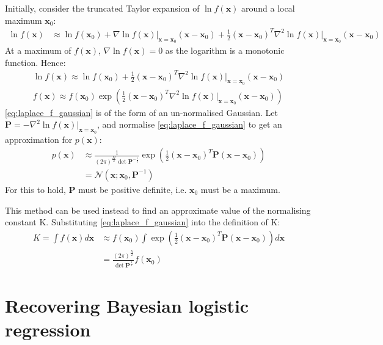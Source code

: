 \documentclass[a4paper]{article}
\begin{document}
    Initially, consider the truncated Taylor expansion of $\ln f(\bm{x})$ around a local maximum $\bm{x}_0$:
    \begin{align}
        \ln f(\bm{x}) &\approx \ln f(\bm{x}_0) + \nabla \ln f(\bm{x}) \big|_{\bm{x} = \bm{x}_0} (\bm{x} - \bm{x}_0)
        + \frac{1}{2} (\bm{x} - \bm{x}_0)^T \nabla^2 \ln f(\bm{x}) \big|_{\bm{x} = \bm{x}_0} (\bm{x} - \bm{x}_0)
    \end{align}
    At a maximum of $f(\bm{x})$, $\nabla \ln f(\bm{x}) = 0$ as the logarithm is a monotonic function. Hence:
    \begin{align}
        \ln f(\bm{x}) \approx \ln f(\bm{x}_0) + \frac{1}{2} (\bm{x} - \bm{x}_0)^T \nabla^2 \ln f(\bm{x}) \big|_{\bm{x} = \bm{x}_0} (\bm{x} - \bm{x}_0) \nonumber \\
        f(\bm{x}) \approx f(\bm{x}_0) \exp \left(\frac{1}{2} (\bm{x} - \bm{x}_0)^T \nabla^2 \ln f(\bm{x}) \big|_{\bm{x} = \bm{x}_0} (\bm{x} - \bm{x}_0) \right)
        \label{eq:laplace_f_gaussian}
    \end{align}
    \autoref{eq:laplace_f_gaussian} is of the form of an un-normalised Gaussian. Let $\bm{P} = -\nabla^2 \ln f(\bm{x})\big|_{\bm{x} = \bm{x}_0}$,
    and normalise \autoref{eq:laplace_f_gaussian} to get an approximation for $p(\bm{x})$:
    \begin{align}
        p(\bm{x}) &\approx \frac{1}{(2\pi)^\frac{M}{2} \det\bm{P}^{-\frac{1}{2}}} \exp \left(\frac{1}{2} (\bm{x} - \bm{x}_0)^T \bm{P} (\bm{x} - \bm{x}_0) \right) \nonumber \\
        &= \mathcal{N}(\bm{x}; \bm{x}_0, \bm{P}^{-1})
        \label{eq:laplace_approximation}
    \end{align}
    For this to hold, $\bm{P}$ must be positive definite, i.e. $\bm{x}_0$ must be a maximum.

    This method can be used instead to find an approximate value of the normalising constant K. Substituting
    \autoref{eq:laplace_f_gaussian} into the definition of K:
    \begin{align}
        K = \int f(\bm{x}) d\bm{x} &\approx f(\bm{x}_0) \int \exp \left(\frac{1}{2} (\bm{x} - \bm{x}_0)^T \bm{P} (\bm{x} - \bm{x}_0) \right) d\bm{x} \nonumber \\
        &= \frac{(2\pi)^\frac{N}{2}}{\det \bm{P}^\frac{1}{2}} f(\bm{x}_0)
        \label{eq:normalising_constant}
    \end{align}

    \section{Recovering Bayesian logistic regression}
\end{document}
